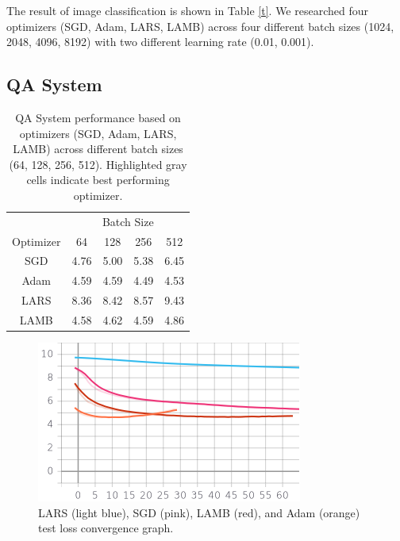 The result of image classification is shown in Table \ref{t}. We researched four optimizers (SGD, Adam, LARS, LAMB) across four different batch sizes (1024, 2048, 4096, 8192) with two different learning rate (0.01, 0.001). 


\subsection{QA System}

\begin{table}[!t]
\vspace{-5pt}
\small
\vspace{7pt}
\caption{QA System performance based on optimizers (SGD, Adam, LARS, LAMB) across different batch sizes (64, 128, 256, 512). Highlighted gray cells indicate best performing optimizer.}\label{tbl:qa_results}
\vspace{-10pt}
\begin{center}
\begin{tabular}{ c|c|c|c|c}
\multicolumn{1}{c|}{} &  \multicolumn{4}{c}{Batch Size}\\ \cline{2-5}
\multicolumn{1}{c|}{Optimizer} &
 \multicolumn{1}{c|}{64} &
 \multicolumn{1}{c|}{128} &
 \multicolumn{1}{c|}{256} &
 \multicolumn{1}{c}{512} \\
\hline
SGD & 4.76 & 5.00 & 5.38 & 6.45\\
Adam &  4.59 & \cellcolor{gray!30} 4.59 &  \cellcolor{gray!30} 4.49 & \cellcolor{gray!30} 4.53\\
LARS & 8.36 & 8.42 & 8.57 & 9.43\\
LAMB & \cellcolor{gray!30} 4.58 & 4.62 & 4.59 & 4.86\\
\end{tabular}
\end{center}
\vspace{-15pt}
\end{table}



\begin{figure}[!t]
    \centering
    \includegraphics[width=0.7\linewidth]{img/drqa_128_blars_oadam_psgd_rlamb.png}
    \caption{LARS (light blue), SGD (pink), LAMB (red), and Adam (orange) test loss convergence graph.}
    \label{fig:128}
\end{figure}

